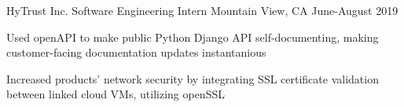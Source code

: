 \documentclass[11pt, a4paper]{awesome-cv}
\begin{document}
\begin{cventries}

  \cventry
    {HyTrust Inc.}
    {Software Engineering Intern}
    {Mountain View, CA}
    {June-August 2019}
    {
      \begin{cvitems}
      	\item {Used openAPI to make public Python Django API self-documenting, making customer-facing documentation updates instantanious}
	      \item {Increased products' network security by integrating SSL certificate validation between linked cloud VMs, utilizing openSSL}
      \end{cvitems}
    }




\end{cventries}
\end{document}
